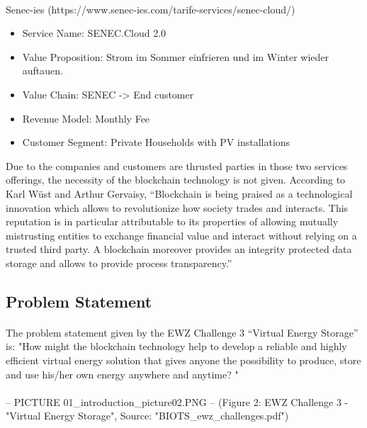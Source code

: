 \documentclass{scrartcl}
\begin{document}
\paragraph{}
Senec-ies (https://www.senec-ies.com/tarife-services/senec-cloud/)
\begin{itemize}
\item Service Name:		SENEC.Cloud 2.0
\item Value Proposition:	Strom im Sommer einfrieren und im Winter wieder auftauen.
\item Value Chain:		SENEC -> End customer
\item Revenue Model: 	Monthly Fee
\item Customer Segment:	Private Households with PV installations
\end{itemize}


    Due to the companies and customers are thrusted parties in those two services offerings, the necessity of the blockchain technology is not given. According to Karl Wüst and Arthur Gervaisy, “Blockchain is being praised as a technological innovation which allows to revolutionize how society trades and interacts. This reputation is in particular attributable to its properties of allowing mutually mistrusting entities to exchange financial value and interact without relying on a trusted third party. A blockchain moreover provides an integrity protected data storage and allows to provide process transparency.” 

\subsection{Problem Statement}
 \paragraph{}
    The problem statement given by the EWZ Challenge 3 “Virtual Energy Storage” is: "How might the blockchain technology help to develop a reliable and highly efficient virtual energy solution that gives anyone the possibility to produce, store and use his/her own energy anywhere and anytime? " 
    \paragraph{}
    -- PICTURE 01\_introduction\_picture02.PNG -- 
    (Figure 2: EWZ Challenge 3 - "Virtual Energy Storage", Source: "BIOTS_ewz_challenges.pdf")
    \paragraph{}
\end{document}
